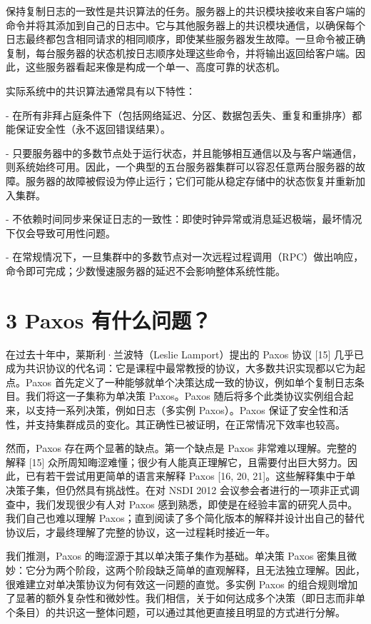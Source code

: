 \documentclass[12pt,a4paper]{report} %
\begin{document}
保持复制日志的一致性是共识算法的任务。服务器上的共识模块接收来自客户端的命令并将其添加到自己的日志中。它与其他服务器上的共识模块通信，以确保每个日志最终都包含相同请求的相同顺序，即使某些服务器发生故障。一旦命令被正确复制，每台服务器的状态机按日志顺序处理这些命令，并将输出返回给客户端。因此，这些服务器看起来像是构成一个单一、高度可靠的状态机。

实际系统中的共识算法通常具有以下特性：

- 在所有非拜占庭条件下（包括网络延迟、分区、数据包丢失、重复和重排序）都能保证安全性（永不返回错误结果）。

- 只要服务器中的多数节点处于运行状态，并且能够相互通信以及与客户端通信，则系统始终可用。因此，一个典型的五台服务器集群可以容忍任意两台服务器的故障。服务器的故障被假设为停止运行；它们可能从稳定存储中的状态恢复并重新加入集群。

- 不依赖时间同步来保证日志的一致性：即使时钟异常或消息延迟极端，最坏情况下仅会导致可用性问题。

- 在常规情况下，一旦集群中的多数节点对一次远程过程调用（RPC）做出响应，命令即可完成；少数慢速服务器的延迟不会影响整体系统性能。

\section*{3 Paxos 有什么问题？}

在过去十年中，莱斯利·兰波特（Leslie Lamport）提出的 Paxos 协议 [15] 几乎已成为共识协议的代名词：它是课程中最常教授的协议，大多数共识实现都以它为起点。Paxos 首先定义了一种能够就单个决策达成一致的协议，例如单个复制日志条目。我们将这一子集称为单决策 Paxos。Paxos 随后将多个此类协议实例组合起来，以支持一系列决策，例如日志（多实例 Paxos）。Paxos 保证了安全性和活性，并支持集群成员的变化。其正确性已被证明，在正常情况下效率也较高。

然而，Paxos 存在两个显著的缺点。第一个缺点是 Paxos 非常难以理解。完整的解释 [15] 众所周知晦涩难懂；很少有人能真正理解它，且需要付出巨大努力。因此，已有若干尝试用更简单的语言来解释 Paxos [16, 20, 21]。这些解释集中于单决策子集，但仍然具有挑战性。在对 NSDI 2012 会议参会者进行的一项非正式调查中，我们发现很少有人对 Paxos 感到熟悉，即使是在经验丰富的研究人员中。我们自己也难以理解 Paxos；直到阅读了多个简化版本的解释并设计出自己的替代协议后，才最终理解了完整的协议，这一过程耗时接近一年。

我们推测，Paxos 的晦涩源于其以单决策子集作为基础。单决策 Paxos 密集且微妙：它分为两个阶段，这两个阶段缺乏简单的直观解释，且无法独立理解。因此，很难建立对单决策协议为何有效这一问题的直觉。多实例 Paxos 的组合规则增加了显著的额外复杂性和微妙性。我们相信，关于如何达成多个决策（即日志而非单个条目）的共识这一整体问题，可以通过其他更直接且明显的方式进行分解。
\end{document}
